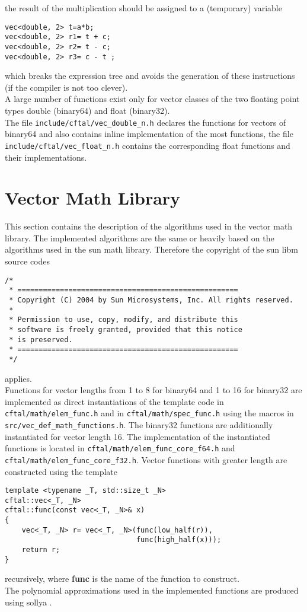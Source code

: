 \documentclass[10pt,a4paper,final,oneside]{article}
\numberwithin{equation}{subsection}
\begin{document}
the result of the multiplication should be assigned to a (temporary)
variable
\begin{lstlisting}
vec<double, 2> t=a*b;
vec<double, 2> r1= t + c;
vec<double, 2> r2= t - c;
vec<double, 2> r3= c - t ;
\end{lstlisting}
which breaks the expression tree and avoids the generation of these
instructions (if the compiler is not too clever).\\[10pt]
%
A large number of functions exist only for vector classes of the
two floating point types double (binary64) and float (binary32).\\
The file \texttt{include/cftal/vec\_double\_n.h} declares the functions
for vectors of binary64 and also contains inline implementation of
the most functions, the file \texttt{include/cftal/vec\_float\_n.h} contains
the corresponding float functions and their implementations.

\section{Vector Math Library}
\label{sec:vec_math_lib}

This section contains the description of the algorithms used in the
vector math library. The implemented algorithms are the same or
heavily based on the algorithms used in the sun math
library. Therefore the copyright of the sun libm source codes
\small
\begin{verbatim}
/*
 * ====================================================
 * Copyright (C) 2004 by Sun Microsystems, Inc. All rights reserved.
 *
 * Permission to use, copy, modify, and distribute this
 * software is freely granted, provided that this notice
 * is preserved.
 * ====================================================
 */
\end{verbatim}
\normalsize
applies.\\[10pt]
%
Functions for vector lengths from 1 to 8 for binary64 and
1 to 16 for binary32 are implemented as direct instantiations of
the template code in
\lstinline{cftal/math/elem_func.h}
and in \lstinline{cftal/math/spec_func.h}
using the macros in
\lstinline{src/vec_def_math_functions.h}.
The binary32 functions are additionally instantiated for vector length 16.
The implementation of the instantiated functions is located in
\lstinline{cftal/math/elem_func_core_f64.h} and
\lstinline{cftal/math/elem_func_core_f32.h}.
Vector functions with greater length are constructed using the template
\begin{lstlisting}
template <typename _T, std::size_t _N>
cftal::vec<_T, _N>
cftal::func(const vec<_T, _N>& x)
{
    vec<_T, _N> r= vec<_T, _N>(func(low_half(r)),
                               func(high_half(x)));
    return r;
}
\end{lstlisting}
recursively, where \textbf{func} is the name of the
function to construct.\\[10pt]
The polynomial approximations used in the implemented functions
are produced using sollya \cite{ChevillardJoldesLauter2010}.
\end{document}
